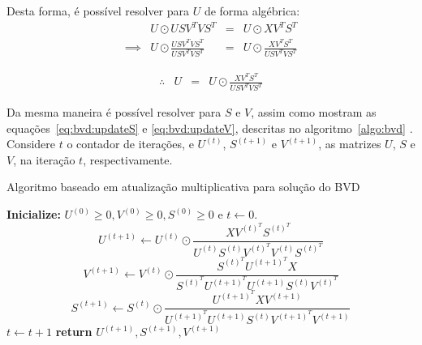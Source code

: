 \documentclass[
    12pt,                %
    oneside,            %
    a4paper,            %
    english,            %
    brazil                %
    ]{abntex2ppgsi}
\begin{document}
Desta forma, é possível resolver para $U$ de forma algébrica:
\[
\begin{array}{lclclcl}
             & U \odot U S V^{T} V S^{T}                           & = & U \odot X V^{T} S^{T} \\
    \implies & U \odot \frac{U S V^{T} V S^{T}}{U S V^{T} V S^{T}} & = & U \odot \frac{X V^{T} S^{T}}{U S V^{T} V S^{T}}
\end{array}
\]

\[
    \begin{array}{lclcl}
        \therefore & U & = & U \odot \frac{X V^{T} S^{T}}{U S V^{T} V S^{T}}
    \end{array}
\]

Da mesma maneira é possível resolver para $S$ e $V$, assim como mostram as equações~\ref{eq:bvd:updateS} e \ref{eq:bvd:updateV}, descritas no algoritmo~\ref{algo:bvd} \cite{Long2005}.
Considere $t$ o contador de iterações, e $U^{(t)}$, $S^{(t+1)}$ e $V^{(t+1)}$, as matrizes $U$, $S$ e $V$, na iteração $t$, respectivamente.

\begin{algorithm}
\caption{Algoritmo baseado em atualização multiplicativa para solução do BVD}
\label{algo:bvd}
    \begin{algorithmic}[1]
            \State \textbf{Inicialize:} $U^{(0)} \geq 0, V^{(0)} \geq 0, S^{(0)} \geq 0$ e $t \gets 0$.
                \State
                    \begin{equation}
                    \label{eq:bvd:updateU}
                        U^{(t+1)} \gets U^{(t)} \odot \frac{ X V^{(t)^T} S^{(t)^T} }{ U^{(t)} S^{(t)} V^{(t)^T} V^{(t)} S^{(t)^T} }
                    \end{equation}
                \State
                    \begin{equation}
                    \label{eq:bvd:updateV}
                        V^{(t+1)} \gets V^{(t)} \odot \frac{ S^{(t)^T} U^{(t+1)^T} X }{ S^{(t)^T} U^{(t+1)^T} U^{(t+1)} S^{(t)} V^{(t)^T} }
                    \end{equation}
                \State
                    \begin{equation}
                    \label{eq:bvd:updateS}
                        S^{(t+1)} \gets S^{(t)} \odot \frac{ U^{(t+1)^T} X V^{(t+1)} }{ U^{(t+1)^T} U^{(t+1)} S^{(t)} V^{(t+1)^T} V^{(t+1)} }
                    \end{equation}
                \State $t \gets t + 1$
            \EndWhile\label{euclidendwhile}
            \State \textbf{return} $U^{(t+1)}, S^{(t+1)}, V^{(t+1)}$
        \EndFunction
    \end{algorithmic}
\end{algorithm}
\end{document}

